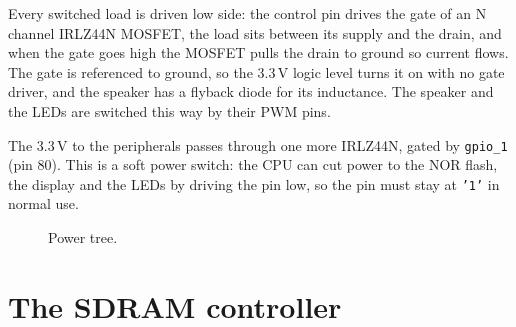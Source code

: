 \documentclass[a4paper,10pt]{article}
\begin{document}
Every switched load is driven low side: the control pin drives the gate of an N channel
IRLZ44N MOSFET, the load sits between its supply and the drain, and when the gate goes high
the MOSFET pulls the drain to ground so current flows. The gate is referenced to ground, so
the 3.3\,V logic level turns it on with no gate driver, and the speaker has a flyback diode
for its inductance. The speaker and the LEDs are switched this way by their PWM pins.

The 3.3\,V to the peripherals passes through one more IRLZ44N, gated by \texttt{gpio\_1}
(pin 80). This is a soft power switch: the CPU can cut power to the NOR flash, the display
and the LEDs by driving the pin low, so the pin must stay at \texttt{'1'} in normal use.

\begin{figure}[H]
\centering
{}
\caption{Power tree.}
\label{fig:power}
\end{figure}

\section{The SDRAM controller}
\label{sec:sdram}
\end{document}
